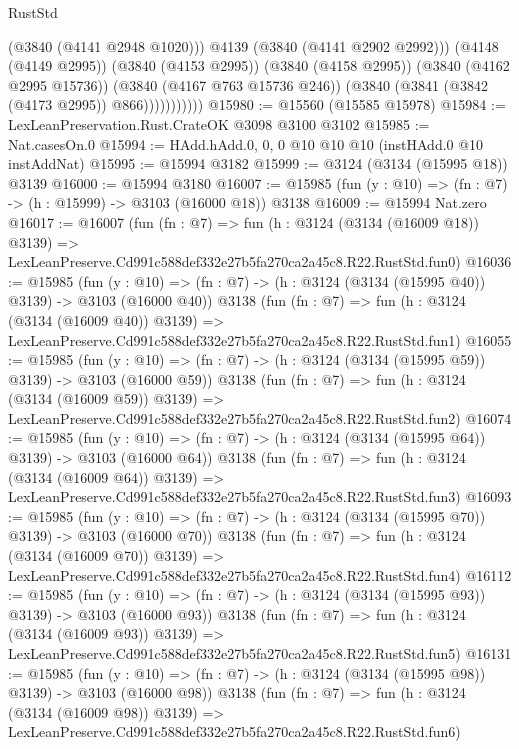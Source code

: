 \begin{lexlean}{RustStd}
\begin{coremodule}
                          (@3840 (@4141 @2948 @1020)))
                        @4139
                        (@3840 (@4141 @2902 @2992)))
                      (@4148 (@4149 @2995))
                      (@3840 (@4153 @2995))
                      (@3840 (@4158 @2995))
                      (@3840 (@4162 @2995 @15736))
                      (@3840 (@4167 @763 @15736 @246))
                      (@3840 (@3841 (@3842 (@4173 @2995)) @866)))))))))))
@15980 := @15560 (@15585 @15978)
@15984 := LexLeanPreservation.Rust.CrateOK @3098 @3100 @3102
@15985 := Nat.casesOn.{0}
@15994 := HAdd.hAdd.{0, 0, 0} @10 @10 @10 (instHAdd.{0} @10 instAddNat)
@15995 := @15994 @3182
@15999 := @3124 (@3134 (@15995 @18)) @3139
@16000 := @15994 @3180
@16007 := @15985 (fun (y : @10) => (fn : @7) -> (h : @15999) -> @3103 (@16000 @18)) @3138
@16009 := @15994 Nat.zero
@16017 := @16007
    (fun (fn : @7) =>
    fun (h : @3124 (@3134 (@16009 @18)) @3139) =>
    LexLeanPreserve.Cd991c588def332e27b5fa270ca2a45c8.R22.RustStd.fun0)
@16036 := @15985
    (fun (y : @10) => (fn : @7) -> (h : @3124 (@3134 (@15995 @40)) @3139) -> @3103 (@16000 @40))
    @3138
    (fun (fn : @7) =>
    fun (h : @3124 (@3134 (@16009 @40)) @3139) =>
    LexLeanPreserve.Cd991c588def332e27b5fa270ca2a45c8.R22.RustStd.fun1)
@16055 := @15985
    (fun (y : @10) => (fn : @7) -> (h : @3124 (@3134 (@15995 @59)) @3139) -> @3103 (@16000 @59))
    @3138
    (fun (fn : @7) =>
    fun (h : @3124 (@3134 (@16009 @59)) @3139) =>
    LexLeanPreserve.Cd991c588def332e27b5fa270ca2a45c8.R22.RustStd.fun2)
@16074 := @15985
    (fun (y : @10) => (fn : @7) -> (h : @3124 (@3134 (@15995 @64)) @3139) -> @3103 (@16000 @64))
    @3138
    (fun (fn : @7) =>
    fun (h : @3124 (@3134 (@16009 @64)) @3139) =>
    LexLeanPreserve.Cd991c588def332e27b5fa270ca2a45c8.R22.RustStd.fun3)
@16093 := @15985
    (fun (y : @10) => (fn : @7) -> (h : @3124 (@3134 (@15995 @70)) @3139) -> @3103 (@16000 @70))
    @3138
    (fun (fn : @7) =>
    fun (h : @3124 (@3134 (@16009 @70)) @3139) =>
    LexLeanPreserve.Cd991c588def332e27b5fa270ca2a45c8.R22.RustStd.fun4)
@16112 := @15985
    (fun (y : @10) => (fn : @7) -> (h : @3124 (@3134 (@15995 @93)) @3139) -> @3103 (@16000 @93))
    @3138
    (fun (fn : @7) =>
    fun (h : @3124 (@3134 (@16009 @93)) @3139) =>
    LexLeanPreserve.Cd991c588def332e27b5fa270ca2a45c8.R22.RustStd.fun5)
@16131 := @15985
    (fun (y : @10) => (fn : @7) -> (h : @3124 (@3134 (@15995 @98)) @3139) -> @3103 (@16000 @98))
    @3138
    (fun (fn : @7) =>
    fun (h : @3124 (@3134 (@16009 @98)) @3139) =>
    LexLeanPreserve.Cd991c588def332e27b5fa270ca2a45c8.R22.RustStd.fun6)

\end{coremodule}
\end{lexlean}
